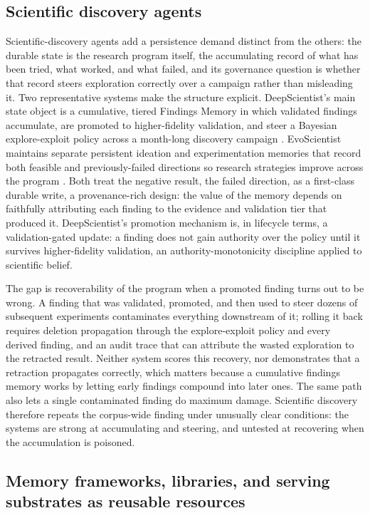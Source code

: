 \subsection{Scientific discovery agents}

Scientific-discovery agents add a persistence demand distinct from the others: the durable state is the research program itself, the accumulating record of what has been tried, what worked, and what failed, and its governance question is whether that record steers exploration correctly over a campaign rather than misleading it. Two representative systems make the structure explicit. DeepScientist's main state object is a cumulative, tiered Findings Memory in which validated findings accumulate, are promoted to higher-fidelity validation, and steer a Bayesian explore-exploit policy across a month-long discovery campaign \citep{weng2025deepscientist}. EvoScientist maintains separate persistent ideation and experimentation memories that record both feasible and previously-failed directions so research strategies improve across the program \citep{lyu2026evoscientist}. Both treat the negative result, the failed direction, as a first-class durable write, a provenance-rich design: the value of the memory depends on faithfully attributing each finding to the evidence and validation tier that produced it. DeepScientist's promotion mechanism is, in lifecycle terms, a validation-gated update: a finding does not gain authority over the policy until it survives higher-fidelity validation, an authority-monotonicity discipline applied to scientific belief.

The gap is recoverability of the program when a promoted finding turns out to be wrong. A finding that was validated, promoted, and then used to steer dozens of subsequent experiments contaminates everything downstream of it; rolling it back requires deletion propagation through the explore-exploit policy and every derived finding, and an audit trace that can attribute the wasted exploration to the retracted result. Neither system scores this recovery, nor demonstrates that a retraction propagates correctly, which matters because a cumulative findings memory works by letting early findings compound into later ones. The same path also lets a single contaminated finding do maximum damage. Scientific discovery therefore repeats the corpus-wide finding under unusually clear conditions: the systems are strong at accumulating and steering, and untested at recovering when the accumulation is poisoned.

\subsection{Memory frameworks, libraries, and serving substrates as reusable resources}

